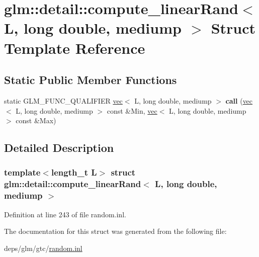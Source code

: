 \hypertarget{structglm_1_1detail_1_1compute__linearRand_3_01L_00_01long_01double_00_01mediump_01_4}{}\section{glm\+:\+:detail\+:\+:compute\+\_\+linear\+Rand$<$ L, long double, mediump $>$ Struct Template Reference}
\label{structglm_1_1detail_1_1compute__linearRand_3_01L_00_01long_01double_00_01mediump_01_4}
\subsection*{Static Public Member Functions}
\begin{DoxyCompactItemize}
\item 
\mbox{\label{structglm_1_1detail_1_1compute__linearRand_3_01L_00_01long_01double_00_01mediump_01_4_af3facb866b39fbe85c77a532d3ea9d59}} 
static G\+L\+M\+\_\+\+F\+U\+N\+C\+\_\+\+Q\+U\+A\+L\+I\+F\+I\+ER \hyperlink{structglm_1_1vec}{vec}$<$ L, long double, mediump $>$ {\bfseries call} (\hyperlink{structglm_1_1vec}{vec}$<$ L, long double, mediump $>$ const \&Min, \hyperlink{structglm_1_1vec}{vec}$<$ L, long double, mediump $>$ const \&Max)
\end{DoxyCompactItemize}


\subsection{Detailed Description}
\subsubsection*{template$<$length\+\_\+t L$>$\newline
struct glm\+::detail\+::compute\+\_\+linear\+Rand$<$ L, long double, mediump $>$}



Definition at line 243 of file random.\+inl.



The documentation for this struct was generated from the following file\+:\begin{DoxyCompactItemize}
\item 
deps/glm/gtc/\hyperlink{random_8inl}{random.\+inl}\end{DoxyCompactItemize}
